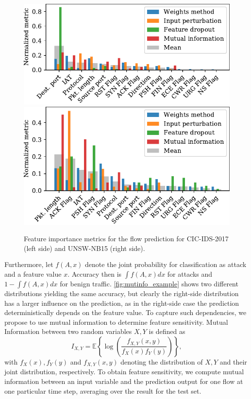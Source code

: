 \documentclass[conference]{IEEEtran}
\newcommand\note[2]{{\color{#1}#2}}
\newcommand\todo[1]{{\note{red}{TODO: #1}}}
\begin{document}
\begin{figure}
\includegraphics[width=.49\textwidth]{../plots/importance/feat_imp_flow_2017.pdf}\hspace{.02\textwidth}
\includegraphics[width=.49\textwidth]{../plots/importance/feat_imp_flow_2015.pdf}
\caption{Feature importance metrics for the flow prediction for CIC-IDS-2017 (left side) and UNSW-NB15 (right side).}
\label{fig:feat_imp}
\end{figure}
Furthermore, let $f(A,x)$  denote the joint probability
for classification as attack and a feature value $x$. Accuracy then is $\int f(A,x) dx$ for attacks and $1-\int f(A,x) dx$ for benign traffic.
\autoref{fig:mutinfo_example} shows two different distributions
yielding the same accuracy, but clearly the right-side distribution has a larger influence on the prediction, as in the right-side case the prediction deterministically depends on the feature value.
To capture such dependencies, we propose to use mutual information %
to determine feature sensitivity.
Mutual Information between two random variables $X,Y$ is defined as
\begin{equation}
I_{X,Y} = \mathbb E \left\{ \log\left(\frac{f_{X,Y}(x,y)}{f_X(x)f_Y(y)}\right) \right\},
\end{equation}
with $f_X(x), f_Y(y)$ and $f_{X,Y}(x,y)$ denoting the distribution of $X,Y$ and their joint distribution, respectively. To obtain feature sensitivity, we compute mutual information between an input variable and the prediction output for one flow at one particular time step, averaging over the result for the test set.
\end{document}
